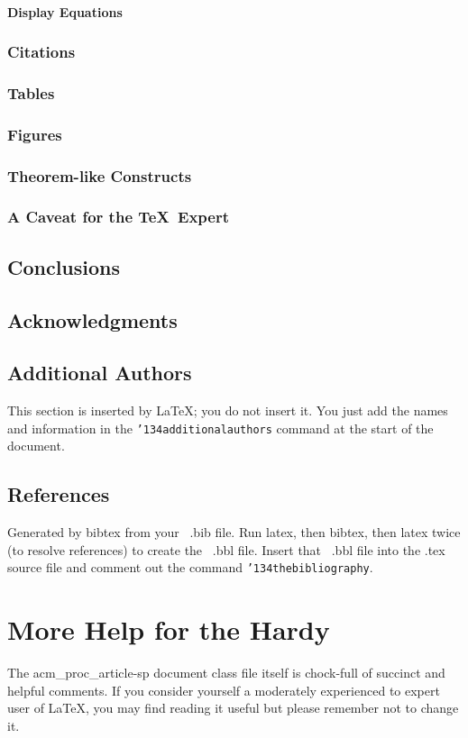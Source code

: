 \documentclass{sig-alternate2-pods09}
\begin{document}
\paragraph{Display Equations}
\subsubsection{Citations}
\subsubsection{Tables}
\subsubsection{Figures}
\subsubsection{Theorem-like Constructs}
\subsubsection*{A Caveat for the \TeX\ Expert}
\subsection{Conclusions}
\subsection{Acknowledgments}
\subsection{Additional Authors}
This section is inserted by \LaTeX; you do not insert it.
You just add the names and information in the
\texttt{{\char'134}additionalauthors} command at the start
of the document.
\subsection{References}
Generated by bibtex from your ~.bib file.  Run latex,
then bibtex, then latex twice (to resolve references)
to create the ~.bbl file.  Insert that ~.bbl file into
the .tex source file and comment out
the command \texttt{{\char'134}thebibliography}.
\section{More Help for the Hardy}
The acm\_proc\_article-sp document class file itself is chock-full of succinct
and helpful comments.  If you consider yourself a moderately
experienced to expert user of \LaTeX, you may find reading
it useful but please remember not to change it.

\end{document}
